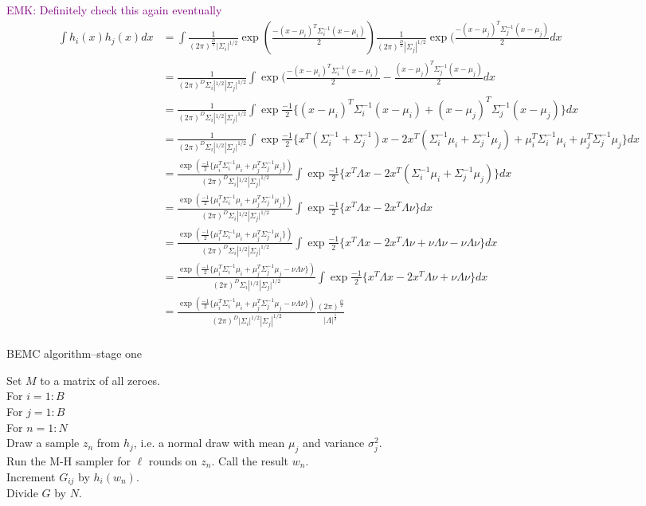 \documentclass{article}
\newcommand\EMK[1]{\textcolor{purple}{EMK: #1}}
\begin{document}
\EMK{Definitely check this again eventually}
\begin{align*}
\int h_i(x)h_j(x)dx 
&= \int \frac{1}{(2\pi)^{\frac{D}{2}} |\Sigma_i|^{1/2}}\exp(\frac{-(x-\mu_i)^T\Sigma_i^{-1}(x-\mu_i)}{2})
\frac{1}{(2\pi)^{\frac{D}{2}} |\Sigma_j|^{1/2}}\exp(\frac{-(x-\mu_j)^T\Sigma_j^{-1}(x-\mu_j)}{2}dx\\
&= \frac{1}{(2\pi)^{D}\Sigma_i|^{1/2}|\Sigma_j|^{1/2}}\int \exp(\frac{-(x-\mu_i)^T\Sigma_i^{-1}(x-\mu_i)}{2} - \frac{(x-\mu_j)^T\Sigma_j^{-1}(x-\mu_j)}{2}dx\\
&= \frac{1}{(2\pi)^{D}\Sigma_i|^{1/2}|\Sigma_j|^{1/2}}
\int \exp \frac{-1}{2} \{
(x-\mu_i)^T\Sigma_i^{-1}(x-\mu_i) +
(x-\mu_j)^T\Sigma_j^{-1}(x-\mu_j) \}dx\\
&= \frac{1}{(2\pi)^{D}\Sigma_i|^{1/2}|\Sigma_j|^{1/2}}
\int \exp \frac{-1}{2} \{
x^T(\Sigma_i^{-1} + \Sigma_j^{-1})x 
- 2x^T(\Sigma_i^{-1}\mu_i + \Sigma_j^{-1}\mu_j)
+ \mu_i^T\Sigma_i^{-1}\mu_i + \mu_j^T\Sigma_j^{-1}\mu_j \}dx\\
&= \frac{\exp(\frac{-1}{2}\{\mu_i^T\Sigma_i^{-1}\mu_i + \mu_j^T\Sigma_j^{-1}\mu_j\})}{(2\pi)^{D}\Sigma_i|^{1/2}|\Sigma_j|^{1/2}} 
\int \exp \frac{-1}{2} \{
x^T\Lambda x 
- 2x^T(\Sigma_i^{-1}\mu_i + \Sigma_j^{-1}\mu_j)\}dx\\
&= \frac{\exp(\frac{-1}{2}\{\mu_i^T\Sigma_i^{-1}\mu_i + \mu_j^T\Sigma_j^{-1}\mu_j\})}{(2\pi)^{D}\Sigma_i|^{1/2}|\Sigma_j|^{1/2}} 
\int \exp \frac{-1}{2} \{x^T\Lambda x - 2x^T\Lambda \nu\}dx\\
&= \frac{\exp(\frac{-1}{2}\{\mu_i^T\Sigma_i^{-1}\mu_i + \mu_j^T\Sigma_j^{-1}\mu_j\})}{(2\pi)^{D}\Sigma_i|^{1/2}|\Sigma_j|^{1/2}} 
\int \exp \frac{-1}{2} \{x^T\Lambda x - 2x^T\Lambda \nu + \nu \Lambda \nu - \nu \Lambda \nu\}dx\\
&= \frac{\exp(\frac{-1}{2}\{\mu_i^T\Sigma_i^{-1}\mu_i + \mu_j^T\Sigma_j^{-1}\mu_j- \nu \Lambda \nu\})}{(2\pi)^{D}\Sigma_i|^{1/2}|\Sigma_j|^{1/2}} 
\int \exp \frac{-1}{2} \{x^T\Lambda x - 2x^T\Lambda \nu + \nu \Lambda \nu \}dx\\
&= \frac{\exp(\frac{-1}{2}\{\mu_i^T\Sigma_i^{-1}\mu_i + \mu_j^T\Sigma_j^{-1}\mu_j- \nu \Lambda \nu\})}{(2\pi)^{D}|\Sigma_i|^{1/2}|\Sigma_j|^{1/2}} \frac{(2\pi)^{\frac{D}{2}}}{|\Lambda|^{\frac{1}{2}}}\\
\end{align*}

\begin{algorithm}[h]
\caption{BEMC algorithm--stage one}
Set $M$ to a matrix of all zeroes.\\
For $i  = 1:B$\\
\Indp
For $j  = 1:B$\\
\Indp
For $n = 1:N$\\
\Indp
Draw a sample $z_n$ from $h_{j}$, i.e. a normal draw with mean $\mu_j$ and variance $\sigma_j^2$.\\
Run the M-H sampler for $\ell$ rounds on $z_n$. Call the result $w_n$.\\
Increment $G_{ij}$ by $h_{i}(w_n)$.\\
\Indm
\Indm
\Indm
Divide $G$ by $N$.

\end{algorithm}
\end{document}
